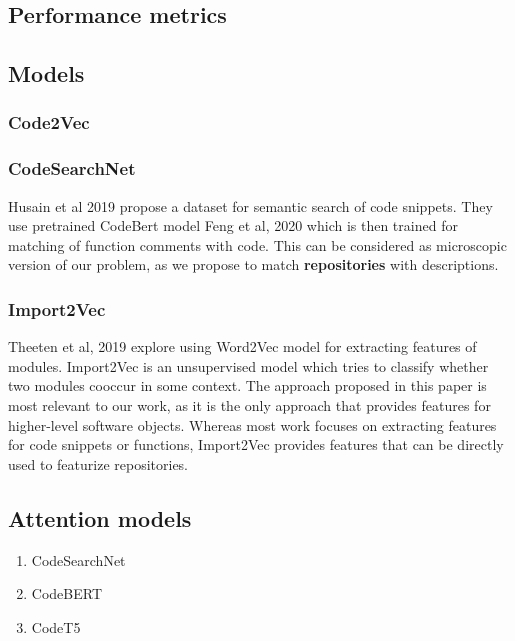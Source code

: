 \documentclass[longabstract,mgr,english]{iithesis}
\begin{document}
\subsection{Performance metrics}

\subsection{Models}

\subsubsection{Code2Vec}

\subsubsection{CodeSearchNet}
Husain et al 2019 \cite{DBLP:journals/corr/abs-1909-09436} propose a dataset for semantic search of code snippets. They use pretrained CodeBert model Feng et al, 2020 \cite{feng2020codebert} which is then trained for matching of function comments with code.
This can be considered as microscopic version of our problem, as we propose to match \textbf{repositories} with descriptions. 

\subsubsection{Import2Vec}

Theeten et al, 2019 \cite{DBLP:journals/corr/abs-1904-03990} explore using Word2Vec model for extracting features of modules. Import2Vec is an unsupervised model which tries to classify whether two modules cooccur in some context.
The approach proposed in this paper is most relevant to our work, as it is the only approach that provides features for higher-level software objects.
Whereas most work focuses on extracting features for code snippets or functions, Import2Vec provides features that can be directly used to featurize repositories.

\subsection{Attention models}

\begin{enumerate}
\item CodeSearchNet

\item CodeBERT

\item{CodeT5}

\end{enumerate}
\end{document}
